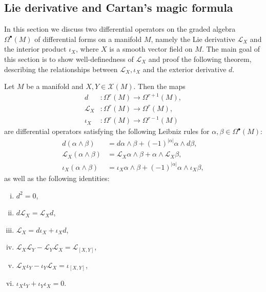 \subsection{Lie derivative and Cartan's magic formula}
In this section we discuss two differential operators on the graded algebra $\Omega^\bullet(M)$ of differential forms on a manifold $M$, namely the Lie derivative $\mathcal{L}_X$ and the interior product $\iota_X$, where $X$ is a smooth vector field on $M$. The main goal of this section is to show well-definedness of $\mathcal{L}_X$ and proof the following theorem, describing the relationships between $\mathcal{L}_X, \iota_X$ and the exterior derivative $d$.

\begin{theorem}
    \label{thm:cartan_calculus}
    Let $M$ be a manifold and $X,Y \in \mathscr{X}(M)$. Then the maps
    \begin{align*}
        d &\colon \Omega^r(M) \to \Omega^{r+1}(M), \\
        \mathcal{L}_X &\colon \Omega^r(M) \to \Omega^r(M), \\
        \iota_X &\colon \Omega^r(M) \to \Omega^{r-1}(M)
    \end{align*}
    are differential operators satisfying the following Leibniz rules for $\alpha, \beta \in \Omega^\bullet(M)$:
    \begin{align*}
        d(\alpha \wedge \beta) &= d\alpha \wedge \beta + (-1)^{|\alpha|} \alpha \wedge d\beta, \\
        \mathcal{L}_X(\alpha \wedge \beta) &= \mathcal{L}_X\alpha \wedge \beta +  \alpha \wedge \mathcal{L}_X\beta, \\
        \iota_X(\alpha \wedge \beta) &= \iota_X\alpha \wedge \beta + (-1)^{|\alpha|} \alpha \wedge \iota_X\beta,
    \end{align*}
    as well as the following identities:
    \begin{enumerate}[(i)]
        \item $d^2 = 0$, \label{eq:cartan1}
        \item $d\mathcal{L}_X = \mathcal{L}_Xd$,\label{eq:cartan2}
        \item $\mathcal{L}_X = d\iota_X + \iota_Xd$,\label{eq:cartan3}
        \item $\mathcal{L}_X\mathcal{L}_Y - \mathcal{L}_Y\mathcal{L}_X = \mathcal{L}_{[X,Y]}$,\label{eq:cartan4}
        \item $\mathcal{L}_X\iota_Y - \iota_Y\mathcal{L}_X = \iota_{[X,Y]}$,\label{eq:cartan5}
        \item $\iota_X\iota_Y + \iota_Y\iota_X = 0$.\label{eq:cartan6}
    \end{enumerate}
\end{theorem}

